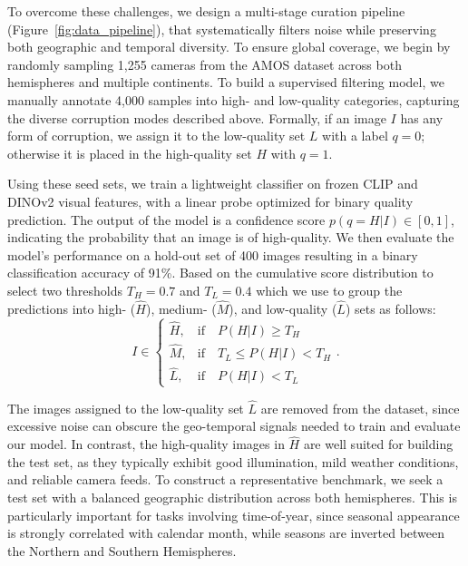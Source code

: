 To overcome these challenges, we design a multi-stage curation pipeline (Figure~\ref{fig:data_pipeline}), that systematically filters noise while preserving both geographic and temporal diversity. To ensure global coverage, we begin by randomly sampling 1,255 cameras from the AMOS dataset across both hemispheres and multiple continents. To build a supervised filtering model, we manually annotate 4,000 samples into high- and low-quality categories, capturing the diverse corruption modes described above. Formally, if an image $I$ has any form of corruption, we assign it to the low-quality set $L$ with a label $q=0$; otherwise it is placed in the high-quality set $H$ with $q=1$. 

Using these seed sets, we train a lightweight classifier on frozen CLIP \cite{clip} and DINOv2 \cite{oquab2023dinov2} visual features, with a linear probe optimized for binary quality prediction. The output of the model is a confidence score $p(q=H|I) \in [0,1]$, indicating the probability that an image is of high-quality. We then evaluate the model's performance on a hold-out set of 400 images resulting in a binary classification accuracy of 91\%. Based on the cumulative score distribution to select two thresholds $T_H=0.7$ and $T_L=0.4$ which we use to group the predictions into high- ($\hat H$), medium- ($\hat M$), and low-quality ($\hat L$) sets as follows:
\begin{equation}
    I \in \begin{cases}
        \hat H, & \mathrm{if} \quad P(H|I) \geq T_H \\
        \hat M, & \mathrm{if} \quad T_L \leq P(H|I) < T_H  \\
        \hat L, & \mathrm{if} \quad P(H|I) < T_L
    \end{cases}.
\end{equation}

The images assigned to the low-quality set $\hat L$ are removed from the dataset, since excessive noise can obscure the geo-temporal signals needed to train and evaluate our model. In contrast, the high-quality images in $\hat H$ are well suited for building the test set, as they typically exhibit good illumination, mild weather conditions, and reliable camera feeds. To construct a representative benchmark, we seek a test set with a balanced geographic distribution across both hemispheres. This is particularly important for tasks involving time-of-year, since seasonal appearance is strongly correlated with calendar month, while seasons are inverted between the Northern and Southern Hemispheres.

